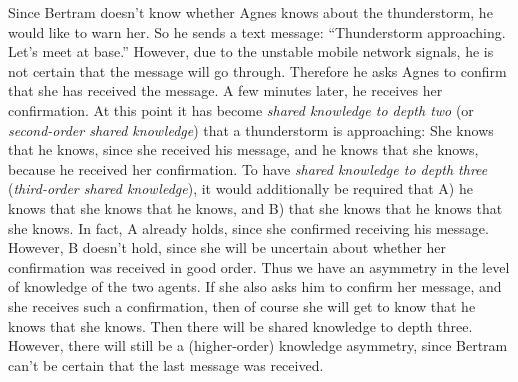 \documentclass[twocolumn,a4paper,superscriptaddress,nofootinbib]{revtex4}
\begin{document}
Since Bertram doesn't know whether Agnes knows about the thunderstorm, he would like to warn her. So he sends a text message: ``Thunderstorm approaching. Let's meet at base.'' However, due to the unstable mobile network signals, he is not certain that the message will go through. Therefore he asks Agnes to confirm that she has received the  message. A few minutes later, he receives her confirmation. At this point it has become \emph{shared knowledge to depth two} (or \emph{second-order shared knowledge}) that a thunderstorm is approaching: She knows that he knows, since she received his message, and he knows that she knows, because he received her confirmation. To have \emph{shared knowledge to depth three} (\emph{third-order shared knowledge}), it would additionally be required that A) he knows that she knows that he knows, and B) that she knows that he knows that she knows. In fact, A already holds, since she confirmed receiving his message. However, B doesn't hold, since she will be uncertain about whether her confirmation was received in good order. Thus we have an asymmetry in the level of knowledge of the two agents. If she also asks him to confirm her message, and she receives such a confirmation, then of course she will get to know that he knows that she knows. Then there will be shared knowledge to depth three. However, there will still be a (higher-order) knowledge asymmetry, since Bertram can't be certain that the last message was received.
\end{document}
